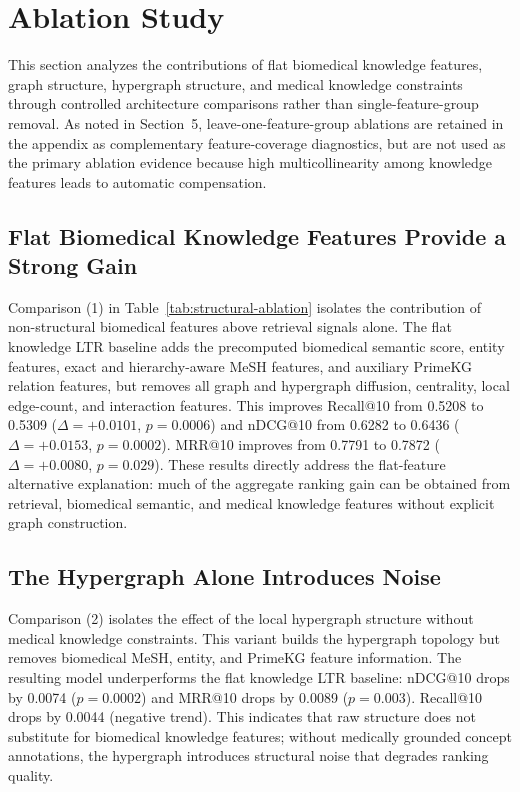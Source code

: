 \section{Ablation Study}

This section analyzes the contributions of flat biomedical knowledge features, graph structure, hypergraph structure, and medical knowledge constraints through controlled architecture comparisons rather than single-feature-group removal. As noted in Section~5, leave-one-feature-group ablations are retained in the appendix as complementary feature-coverage diagnostics, but are not used as the primary ablation evidence because high multicollinearity among knowledge features leads to automatic compensation.



\subsection{Flat Biomedical Knowledge Features Provide a Strong Gain}

Comparison (1) in Table~\ref{tab:structural-ablation} isolates the contribution of non-structural biomedical features above retrieval signals alone. The flat knowledge LTR baseline adds the precomputed biomedical semantic score, entity features, exact and hierarchy-aware MeSH features, and auxiliary PrimeKG relation features, but removes all graph and hypergraph diffusion, centrality, local edge-count, and interaction features. This improves Recall@10 from 0.5208 to 0.5309 ($\Delta = +0.0101$, $p = 0.0006$) and nDCG@10 from 0.6282 to 0.6436 ($\Delta = +0.0153$, $p = 0.0002$). MRR@10 improves from 0.7791 to 0.7872 ($\Delta = +0.0080$, $p = 0.029$). These results directly address the flat-feature alternative explanation: much of the aggregate ranking gain can be obtained from retrieval, biomedical semantic, and medical knowledge features without explicit graph construction.

\subsection{The Hypergraph Alone Introduces Noise}

Comparison (2) isolates the effect of the local hypergraph structure without medical knowledge constraints. This variant builds the hypergraph topology but removes biomedical MeSH, entity, and PrimeKG feature information. The resulting model underperforms the flat knowledge LTR baseline: nDCG@10 drops by 0.0074 ($p = 0.0002$) and MRR@10 drops by 0.0089 ($p = 0.003$). Recall@10 drops by 0.0044 (negative trend). This indicates that raw structure does not substitute for biomedical knowledge features; without medically grounded concept annotations, the hypergraph introduces structural noise that degrades ranking quality.

